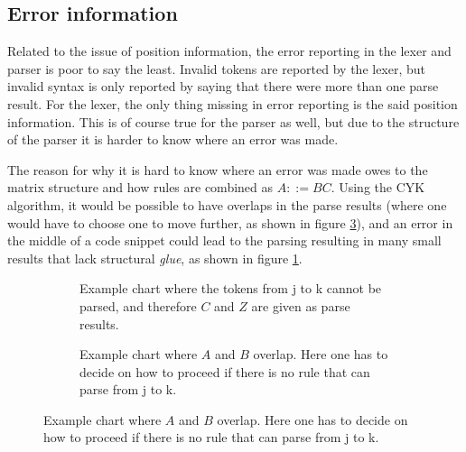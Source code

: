 \documentclass[a4paper,12pt,twosided]{report}
\newcommand{\subt}[3] { 
  \draw[grid] (#1,#1) -- (#1,#2) node[inChart] {#3} -- (#2,#2);
  \fill[color=black] (#1,#2) circle (2pt)
 }
\newcommand{\mrk}[2]{\node[inChart] at (#1,#1) {#2}}
\begin{document}
\subsection{Error information}
Related to the issue of position information, the error reporting in the lexer
and parser is poor to say the least. Invalid tokens are reported by the lexer,
but invalid syntax is only reported by saying that there were more than one
parse result. For the lexer, the only thing missing in error reporting is the
said position information. This is of course true for the parser as well, but
due to the structure of the parser it is harder to know where an error was made.

The reason for why it is hard to know where an error was made owes to the matrix
structure and how rules are combined as $A ::= BC$. Using the CYK algorithm, it
would be possible to have overlaps in the parse results (where one would have to
choose one to move further, as shown in figure \ref{parseoverlap}), and an error
in the middle of a code snippet could lead to the parsing resulting in many
small results that lack structural \textit{glue}, as shown in figure
\ref{missingglue}. 

\begin{figure}[H]
  \centering
  \begin{subfigure}[H]{.4\textwidth}
    \flushleft
     \caption{\label{missingglue}Example chart where the tokens from j to k
     cannot be parsed, and therefore $C$ and $Z$ are given as parse results.}
  \end{subfigure}
  \begin{subfigure}[H]{.1\textwidth}
  \text{}
  \end{subfigure}
  \begin{subfigure}[H]{.4\textwidth}
    \flushright
    \caption{\label{parseoverlap} Example chart where $A$ and $B$ overlap. Here one
    has to decide on how to proceed if there is no rule that can parse from j to
    k.}
  \end{subfigure}
\end{figure}
\end{document}
